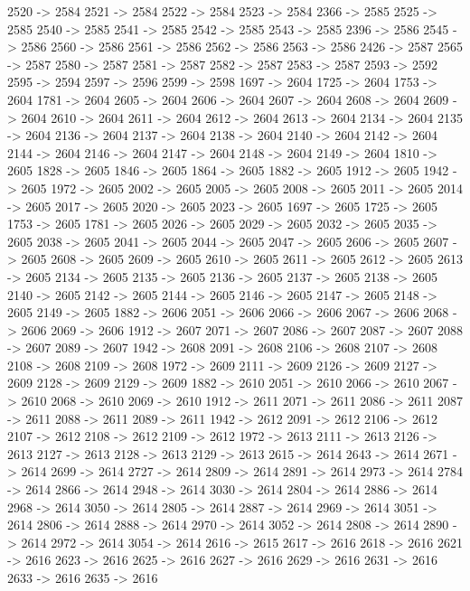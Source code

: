 {	2520 -> 2584
	2521 -> 2584
	2522 -> 2584
	2523 -> 2584
	2366 -> 2585
	2525 -> 2585
	2540 -> 2585
	2541 -> 2585
	2542 -> 2585
	2543 -> 2585
	2396 -> 2586
	2545 -> 2586
	2560 -> 2586
	2561 -> 2586
	2562 -> 2586
	2563 -> 2586
	2426 -> 2587
	2565 -> 2587
	2580 -> 2587
	2581 -> 2587
	2582 -> 2587
	2583 -> 2587
	2593 -> 2592
	2595 -> 2594
	2597 -> 2596
	2599 -> 2598
	1697 -> 2604
	1725 -> 2604
	1753 -> 2604
	1781 -> 2604
	2605 -> 2604
	2606 -> 2604
	2607 -> 2604
	2608 -> 2604
	2609 -> 2604
	2610 -> 2604
	2611 -> 2604
	2612 -> 2604
	2613 -> 2604
	2134 -> 2604
	2135 -> 2604
	2136 -> 2604
	2137 -> 2604
	2138 -> 2604
	2140 -> 2604
	2142 -> 2604
	2144 -> 2604
	2146 -> 2604
	2147 -> 2604
	2148 -> 2604
	2149 -> 2604
	1810 -> 2605
	1828 -> 2605
	1846 -> 2605
	1864 -> 2605
	1882 -> 2605
	1912 -> 2605
	1942 -> 2605
	1972 -> 2605
	2002 -> 2605
	2005 -> 2605
	2008 -> 2605
	2011 -> 2605
	2014 -> 2605
	2017 -> 2605
	2020 -> 2605
	2023 -> 2605
	1697 -> 2605
	1725 -> 2605
	1753 -> 2605
	1781 -> 2605
	2026 -> 2605
	2029 -> 2605
	2032 -> 2605
	2035 -> 2605
	2038 -> 2605
	2041 -> 2605
	2044 -> 2605
	2047 -> 2605
	2606 -> 2605
	2607 -> 2605
	2608 -> 2605
	2609 -> 2605
	2610 -> 2605
	2611 -> 2605
	2612 -> 2605
	2613 -> 2605
	2134 -> 2605
	2135 -> 2605
	2136 -> 2605
	2137 -> 2605
	2138 -> 2605
	2140 -> 2605
	2142 -> 2605
	2144 -> 2605
	2146 -> 2605
	2147 -> 2605
	2148 -> 2605
	2149 -> 2605
	1882 -> 2606
	2051 -> 2606
	2066 -> 2606
	2067 -> 2606
	2068 -> 2606
	2069 -> 2606
	1912 -> 2607
	2071 -> 2607
	2086 -> 2607
	2087 -> 2607
	2088 -> 2607
	2089 -> 2607
	1942 -> 2608
	2091 -> 2608
	2106 -> 2608
	2107 -> 2608
	2108 -> 2608
	2109 -> 2608
	1972 -> 2609
	2111 -> 2609
	2126 -> 2609
	2127 -> 2609
	2128 -> 2609
	2129 -> 2609
	1882 -> 2610
	2051 -> 2610
	2066 -> 2610
	2067 -> 2610
	2068 -> 2610
	2069 -> 2610
	1912 -> 2611
	2071 -> 2611
	2086 -> 2611
	2087 -> 2611
	2088 -> 2611
	2089 -> 2611
	1942 -> 2612
	2091 -> 2612
	2106 -> 2612
	2107 -> 2612
	2108 -> 2612
	2109 -> 2612
	1972 -> 2613
	2111 -> 2613
	2126 -> 2613
	2127 -> 2613
	2128 -> 2613
	2129 -> 2613
	2615 -> 2614
	2643 -> 2614
	2671 -> 2614
	2699 -> 2614
	2727 -> 2614
	2809 -> 2614
	2891 -> 2614
	2973 -> 2614
	2784 -> 2614
	2866 -> 2614
	2948 -> 2614
	3030 -> 2614
	2804 -> 2614
	2886 -> 2614
	2968 -> 2614
	3050 -> 2614
	2805 -> 2614
	2887 -> 2614
	2969 -> 2614
	3051 -> 2614
	2806 -> 2614
	2888 -> 2614
	2970 -> 2614
	3052 -> 2614
	2808 -> 2614
	2890 -> 2614
	2972 -> 2614
	3054 -> 2614
	2616 -> 2615
	2617 -> 2616
	2618 -> 2616
	2621 -> 2616
	2623 -> 2616
	2625 -> 2616
	2627 -> 2616
	2629 -> 2616
	2631 -> 2616
	2633 -> 2616
	2635 -> 2616
}

